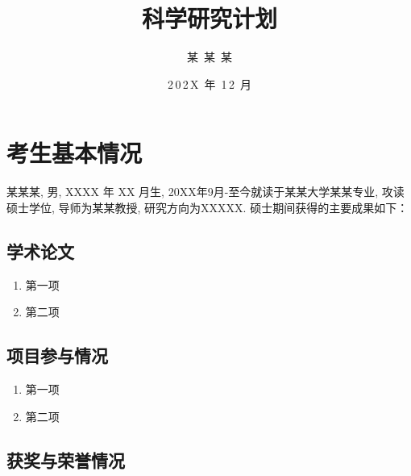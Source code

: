 \documentclass{phdproposal}
\title{科学研究计划}
\author{某~某~某}    %
\date{2\,0\,2\,X~年~1\,2~月}  %
\begin{document}
    \frontmatter

    \maketitle



    \clearpage   %
	
    \maketoc[nopagenum]


	\clearpage  %

    \mainmatter



\chapter{考生基本情况}

某某某, 男, XXXX 年 XX 月生, 20XX年9月-至今就读于某某大学某某专业, 攻读硕士学位, 导师为某某教授, 研究方向为XXXXX. 硕士期间获得的主要成果如下：


\section{学术论文}

\begin{enumerate}[label=(\arabic*)]
	\item 第一项
	\item 第二项
\end{enumerate}

\section{项目参与情况}

\begin{enumerate}[label=(\arabic*)]
	\item 第一项
	\item 第二项
\end{enumerate}

\section{获奖与荣誉情况}
\end{document}
